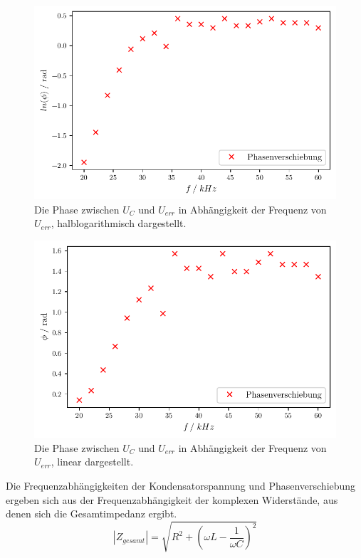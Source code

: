 \begin{figure}
      \centering
      \includegraphics{build/plotd.pdf}
      \caption{Die Phase zwischen $U_C$ und $U_{err}$ in Abhängigkeit der Frequenz von $U_{err}$, halblogarithmisch dargestellt.}
      \label{fig:plotd}
    \end{figure}



    \begin{figure}
      \centering
      \includegraphics{build/plotd2.pdf}
      \caption{Die Phase zwischen $U_C$ und $U_{err}$ in Abhängigkeit der Frequenz von $U_{err}$, linear dargestellt.}
      \label{fig:plotd2}
    \end{figure}



    Die Frequenzabhängigkeiten der Kondensatorspannung und Phasenverschiebung ergeben sich 
    aus der Frequenzabhängigkeit der komplexen Widerstände, aus denen sich die Gesamtimpedanz ergibt. \\
    \begin{equation*}
      |Z_{gesamt}| = \sqrt{R^2+ (\omega L - \frac{1}{\omega C})^2}
    \end{equation*}

